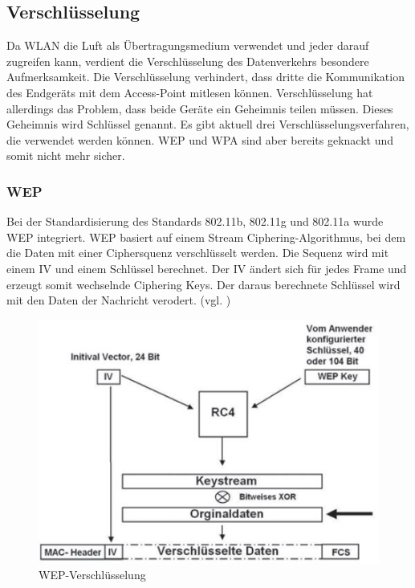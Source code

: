 \subsection{Verschlüsselung}

Da WLAN die Luft als Übertragungsmedium verwendet und jeder darauf zugreifen kann, verdient die Verschlüsselung des Datenverkehrs besondere Aufmerksamkeit. Die Verschlüsselung verhindert, dass dritte die Kommunikation des Endgeräts mit dem Access-Point mitlesen können. Verschlüsselung hat allerdings das Problem, dass beide Geräte ein Geheimnis teilen müssen. Dieses Geheimnis wird Schlüssel genannt. Es gibt aktuell drei Verschlüsselungsverfahren, die verwendet werden können. \ac{WEP} und \ac{WPA} sind aber bereits geknackt und somit nicht mehr sicher.

\subsubsection{\ac{WEP}}
Bei der Standardisierung des Standards 802.11b, 802.11g und 802.11a wurde \ac{WEP} integriert. \ac{WEP} basiert auf einem Stream Ciphering-Algorithmus, bei dem die Daten mit einer Ciphersquenz verschlüsselt werden. Die Sequenz wird mit einem \ac{IV} und einem Schlüssel berechnet. Der \ac{IV} ändert sich für jedes Frame und erzeugt somit wechselnde Ciphering Keys. Der daraus berechnete Schlüssel wird mit den Daten der Nachricht verodert. (vgl. \cite{SWB-430171331})


\begin{figure} [htb]
\begin{centering}
\includegraphics{Bilder/wep_funktionsweise.jpg}
\caption[WEP-Verschlüsselung]{WEP-Verschlüsselung \cite{SWB-430171331}}
\label{wep_funktionsweise}
\end{centering}
\end{figure}

